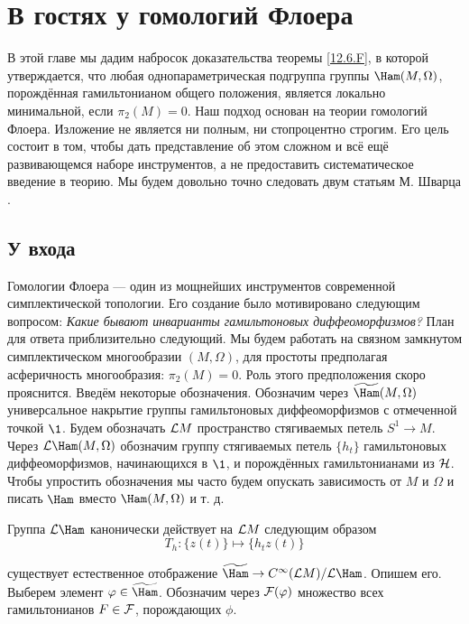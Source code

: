 \chapter[Гомологии Флоера]{В гостях у гомологий Флоера}\label{13}

В этой главе мы дадим набросок доказательства теоремы \ref{12.6.F}, в которой утверждается, что любая однопараметрическая подгруппа группы $\Ham(M, \Omega)$, порождённая гамильтонианом общего положения, является локально минимальной, если $\pi_{2}(M) = 0$.
Наш подход основан на теории гомологий Флоера.
Изложение не является
ни полным, ни стопроцентно строгим.
Его цель состоит в том, чтобы дать представление об этом сложном и всё ещё развивающемся наборе инструментов, а не
предоставить систематическое введение в теорию.
Мы будем довольно точно следовать двум статьям М. Шварца \cite{Sch2,
  Sch3}.

\section{У входа}\label{13.1}

Гомологии Флоера — один из мощнейших инструментов современной
симплектической топологии. 
Его создание было мотивировано следующим вопросом:
\textit{Какие бывают инварианты гамильтоновых диффеоморфизмов?}
План для ответа приблизительно следующий.
Мы будем работать на связном замкнутом симплектическом многообразии
$(M,\Omega)$, для простоты предполагая асферичность многообразия:
$π_{2}(M) = 0$.
Роль этого предположения скоро прояснится.
Введём некоторые обозначения.
Обозначим через $\widetilde\Ham(M,\Omega)$ универсальное накрытие
группы гамильтоновых диффеоморфизмов с отмеченной точкой $\1$.
Будем обозначать $\mathcal{L} M$ пространство стягиваемых петель $S^{1}\to
M$.
Через $\L\Ham(M,\Omega)$ обозначим группу стягиваемых петель
$\{h_{t}\}$ гамильтоновых 
диффеоморфизмов, 
начинающихся в $\1$,
и порождённых гамильтонианами из $\mathcal{H}$.
Чтобы упростить обозначения мы часто будем опускать зависимость от $M$
и $\Omega$ и писать $\Ham$ вместо $\Ham(M, \Omega)$ и т. д. 

Группа $\L\Ham$ канонически действует на $\mathcal{L} M$
следующим образом
\[
T_{h}: \{z(t)\}\mapsto \{h_{t}z(t)\}
\]

  
 существует естественное
отображение $\widetilde\Ham\z\to C^{\infty}(\L M)/\L\Ham$.
Опишем его.
Выберем элемент $\phi\in\widetilde\Ham$.
Обозначим
через $\mathcal{F}(\varphi)$ множество всех гамильтонианов $F\in\mathcal{F}$,
порождающих $\phi$.

